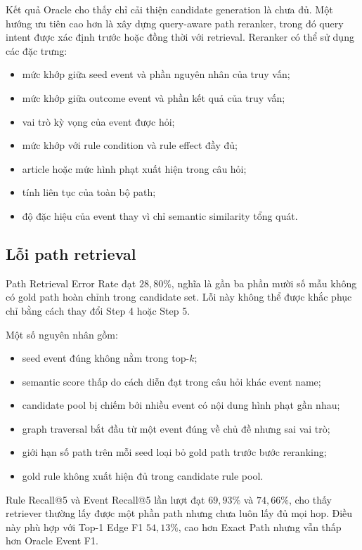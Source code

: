 Kết quả Oracle cho thấy chỉ cải thiện candidate generation là chưa đủ. Một
hướng ưu tiên cao hơn là xây dựng query-aware path reranker, trong đó query
intent được xác định trước hoặc đồng thời với retrieval. Reranker có thể sử
dụng các đặc trưng:

\begin{itemize}
    \item mức khớp giữa seed event và phần nguyên nhân của truy vấn;
    \item mức khớp giữa outcome event và phần kết quả của truy vấn;
    \item vai trò kỳ vọng của event được hỏi;
    \item mức khớp với rule condition và rule effect đầy đủ;
    \item article hoặc mức hình phạt xuất hiện trong câu hỏi;
    \item tính liên tục của toàn bộ path;
    \item độ đặc hiệu của event thay vì chỉ semantic similarity tổng quát.
\end{itemize}

\subsection{Lỗi path retrieval}

Path Retrieval Error Rate đạt \(28{,}80\%\), nghĩa là gần ba phần mười số mẫu
không có gold path hoàn chỉnh trong candidate set. Lỗi này không thể được
khắc phục chỉ bằng cách thay đổi Step 4 hoặc Step 5.

Một số nguyên nhân gồm:

\begin{itemize}
    \item seed event đúng không nằm trong top-\(k\);
    \item semantic score thấp do cách diễn đạt trong câu hỏi khác event name;
    \item candidate pool bị chiếm bởi nhiều event có nội dung hình phạt gần
    nhau;
    \item graph traversal bắt đầu từ một event đúng về chủ đề nhưng sai vai
    trò;
    \item giới hạn số path trên mỗi seed loại bỏ gold path trước bước
    reranking;
    \item gold rule không xuất hiện đủ trong candidate rule pool.
\end{itemize}

Rule Recall@5 và Event Recall@5 lần lượt đạt \(69{,}93\%\) và \(74{,}66\%\),
cho thấy retriever thường lấy được một phần path nhưng chưa luôn lấy đủ mọi
hop. Điều này phù hợp với Top-1 Edge F1 \(54{,}13\%\), cao hơn Exact Path
nhưng vẫn thấp hơn Oracle Event F1.

